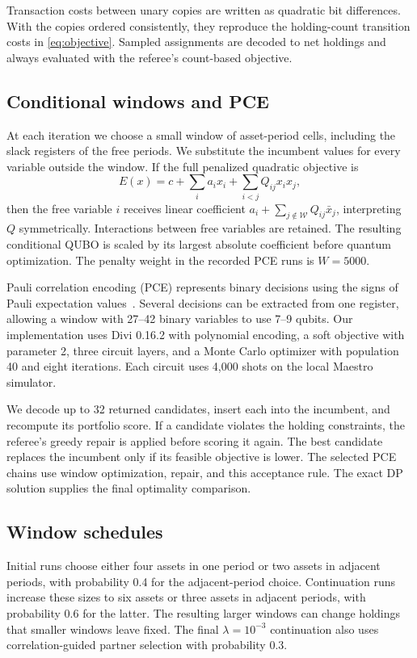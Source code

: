 \documentclass[a4paper]{article}
\begin{document}
Transaction costs between unary copies are written as quadratic bit differences.
With the copies ordered consistently, they reproduce the holding-count transition costs in \eqref{eq:objective}.
Sampled assignments are decoded to net holdings and always evaluated with the referee's count-based objective.

\subsection{Conditional windows and PCE}

At each iteration we choose a small window of asset-period cells, including the slack registers of the free periods.
We substitute the incumbent values for every variable outside the window.
If the full penalized quadratic objective is
\[
E(x)=c+\sum_i a_ix_i+\sum_{i<j}Q_{ij}x_ix_j ,
\]
then the free variable \(i\) receives linear coefficient
\(a_i+\sum_{j\notin\mathcal W}Q_{ij}\bar x_j\), interpreting \(Q\) symmetrically.
Interactions between free variables are retained. The resulting conditional QUBO is scaled by its largest
absolute coefficient before quantum optimization. The penalty weight in the recorded PCE runs is \(W=5000\).

Pauli correlation encoding (PCE) represents binary decisions using the signs of Pauli expectation values~\cite{pce}.
Several decisions can be extracted from one register, allowing a window with 27--42 binary variables to use 7--9 qubits.
Our implementation uses Divi 0.16.2 with polynomial encoding, a soft objective with parameter 2,
three circuit layers, and a Monte Carlo optimizer with population 40 and eight iterations.
Each circuit uses 4,000 shots on the local Maestro simulator.

We decode up to 32 returned candidates, insert each into the incumbent, and recompute its portfolio score.
If a candidate violates the holding constraints, the referee's greedy repair is applied before scoring it again.
The best candidate replaces the incumbent only if its feasible objective is lower.
The selected PCE chains use window optimization, repair, and this acceptance rule.
The exact DP solution supplies the final optimality comparison.

\subsection{Window schedules}

Initial runs choose either four assets in one period or two assets in adjacent periods, with probability 0.4 for
the adjacent-period choice. Continuation runs increase these sizes to six assets or three assets in adjacent periods,
with probability 0.6 for the latter. The resulting larger windows can change holdings that smaller windows leave fixed.
The final \(\lambda=10^{-3}\) continuation also uses correlation-guided partner selection with probability 0.3.
\end{document}
